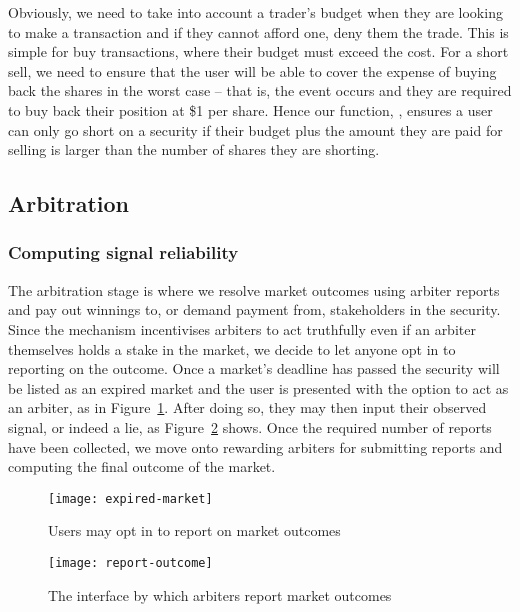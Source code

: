 Obviously, we need to take into account a trader's budget when they are looking
to make a transaction and if they cannot afford one, deny them the trade. This
is simple for buy transactions, where their budget must exceed the cost. For a
short sell, we need to ensure that the user will be able to cover the expense
of buying back the shares in the worst case -- that is, the event occurs and
they are required to buy back their position at \$1 per share. Hence our
function, , ensures a user can only go short on a
security if their budget plus the amount they are paid for selling is larger
than the number of shares they are shorting.

\subsection{Arbitration}

\label{sec:arbitration}

\subsubsection{Computing signal reliability}

The arbitration stage is where we resolve market outcomes using arbiter reports
and pay out winnings to, or demand payment from, stakeholders in the security.
Since the mechanism incentivises arbiters to act truthfully even if an arbiter
themselves holds a stake in the market, we decide to let anyone opt in to
reporting on the outcome. Once a market's deadline has passed the security will
be listed as an expired market and the user is presented with the option to act
as an arbiter, as in Figure~\ref{fig:expiredMarket}. After doing so, they may
then input their observed signal, or indeed a lie, as
Figure~\ref{fig:reportOutcome} shows.  Once the required number of reports have
been collected, we move onto rewarding arbiters for submitting reports and
computing the final outcome of the market.

\begin{figure}[h]
	\centering
	\texttt{[image: expired-market]}
	\caption{Users may opt in to report on market outcomes}
	\label{fig:expiredMarket}
\end{figure}

\begin{figure}[h]
	\centering
	\texttt{[image: report-outcome]}
	\caption{The interface by which arbiters report market outcomes}
	\label{fig:reportOutcome}
\end{figure}

